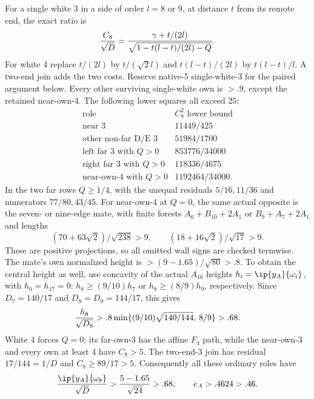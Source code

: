 For a single white 3 in a side of order \(l=8\) or \(9\),
at distance \(t\) from its remote end, the exact ratio is
\[
 {C_8\over\sqrt D}
 ={\gamma+t/(2l)\over
       \sqrt{1-t(l-t)/(2l)-Q}}.
\]
For white 4 replace \(t/(2l)\) by \(t/(\sqrt2l)\) and
\(t(l-t)/(2l)\) by \(t(l-t)/l\).
A two-end join adds the two costs.
Reserve native-5 single-white-3 for the paired argument below.
Every other surviving single-white own is \(>.9\), except the
retained near-own-4.
The following lower squares all exceed \(25\):
\[
\begin{array}{c|c}
\text{role}& C_8^2\text{ lower bound}\\ \hline
\text{near 3}&11449/425\\
\text{other non-far D/E 3}&51984/1700\\
\text{left far 3 with }Q>0&853776/34000\\
\text{right far 3 with }Q>0&118336/4675\\
\text{near-own-4 with }Q>0&1192464/34000 .
\end{array}
\]
In the two far rows \(Q\ge1/4\), with the unequal residuals
\(5/16,11/36\) and numerators \(77/80,43/45\).
For near-own-4 at \(Q=0\), the same actual opposite is the
seven- or nine-edge mate, with finite forests
\(A_6+B_{10}+2A_1\) or \(B_9+A_7+2A_1\) and lengths
\[
 (70+63\sqrt2)/\sqrt{238}>9,\qquad
 (18+16\sqrt2)/\sqrt{17}>9.
\]
These are positive projections, so all omitted wall signs are
checked termwise.
The mate's own normalized height is
\(>(9-1.65)/\sqrt{80}>.8\).
To obtain the central height as well, use concavity of the actual
\(A_{16}\) heights \(h_i=\ip{y_A}{\omega_i}\), with \(h_0=h_{17}=0\):
\(h_8\ge(9/10)h_7\) or \(h_8\ge(8/9)h_9\), respectively.
Since \(D_7=140/17\) and \(D_8=D_9=144/17\), this gives
\[
 {h_8\over\sqrt{D_8}}>
 .8\min\{(9/10)\sqrt{140/144},\,8/9\}>.68 .
\]
White 4 forces \(Q=0\); its far-own-3 has the affine \(F_4\)
path, while the near-own-3 and every own at least 4 have \(C_8>5\).
The two-end-3 join has residual \(17/144=1/D\) and
\(C_8\ge89/17>5\).
Consequently all these ordinary roles have
\[
 {\ip{y_A}{\omega_8}\over\sqrt D}
 >{5-1.65\over\sqrt{24}}>.68,\qquad e_A>.4624>.46.
\]

